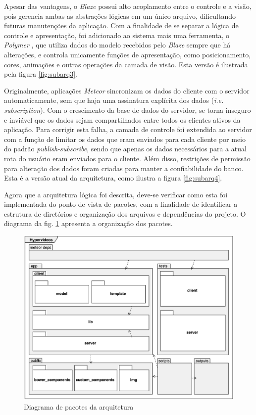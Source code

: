 Apesar das vantagens, o \textit{Blaze} possui alto acoplamento entre o controle e a visão, pois gerencia ambas as abstrações lógicas em um único arquivo, dificultando futuras manutenções da aplicação. Com a finalidade de se separar a lógica de controle e apresentação, foi adicionado ao sistema mais uma ferramenta, o \textit{Polymer} \cite{polymer2015}, que utiliza dados do modelo recebidos pelo \textit{Blaze} sempre que há alterações, e controla unicamente funções de apresentação, como posicionamento, cores, animações e outras operações da camada de visão. Esta versão é ilustrada pela figura \ref{fig:subarq3}.

Originalmente, aplicações \textit{Meteor} sincronizam os dados do cliente com o servidor automaticamente, sem que haja uma assinatura explícita dos dados (\textit{i.e. subscription}). Com o crescimento da base de dados do servidor, se torna inseguro e inviável que os dados sejam compartilhados entre todos os clientes ativos da aplicação. Para corrigir esta falha, a camada de controle foi extendida ao servidor com a função de limitar os dados que eram enviados para cada cliente por meio do padrão \textit{publish-subscribe}, sendo que apenas os dados necessários para a atual rota do usuário eram enviados para o cliente. Além disso, restrições de permissão para alteração dos dados foram criadas para manter a confiabilidade do banco. Esta é a versão atual da arquitetura, como ilustra a figura \ref{fig:subarq4}.

Agora que a arquitetura lógica foi descrita, deve-se verificar como esta foi implementada do ponto de vista de pacotes, com a finalidade de identificar a estrutura de diretórios e organização dos arquivos e dependências do projeto. O diagrama da fig. \ref{fig:arq_pacotes} apresenta a organização dos pacotes.

\begin{figure}[h!]
  	\centering
  	\includegraphics[width=.8\linewidth]{figuras/arq_pacotes.eps}
  	\caption{Diagrama de pacotes da arquitetura}
  	\label{fig:arq_pacotes}
\end{figure}

